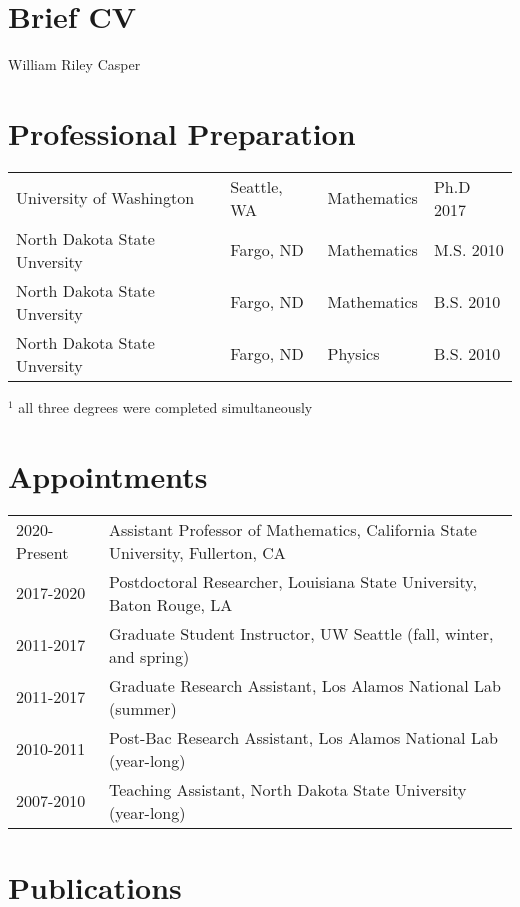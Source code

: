 \documentclass[12pt,letterpaper]{article}
\newcommand{\required}[1]{\section*{\hfil #1\hfil}}                    %
\theoremstyle{definition}
\begin{document}
\required{Brief CV}
\begin{center}
William Riley Casper
\end{center}

\section{Professional Preparation}
\begin{tabular}{llll}
University of Washington\hspace{2in}&Seattle, WA\hspace{2in}&Mathematics\hspace{2in}&Ph.D 2017\\
North Dakota State Unversity&Fargo, ND&Mathematics&M.S. 2010\footnotemark\\
North Dakota State Unversity&Fargo, ND&Mathematics&B.S. 2010\\
North Dakota State Unversity&Fargo, ND&Physics&B.S. 2010\\
\end{tabular}

{$^1$ \footnotesize all three degrees were completed simultaneously}
\section{Appointments}
\begin{tabular}{ll}
2020-Present & Assistant Professor of Mathematics, California State University, Fullerton, CA\\
2017-2020 & Postdoctoral Researcher, Louisiana State University, Baton Rouge, LA\\
2011-2017 & Graduate Student Instructor, UW Seattle (fall, winter, and spring)\\
2011-2017 & Graduate Research Assistant, Los Alamos National Lab (summer)\\
2010-2011 & Post-Bac Research Assistant, Los Alamos National Lab (year-long)\\
2007-2010 & Teaching Assistant, North Dakota State University (year-long)\\
\end{tabular}
\section{Publications}
\end{document}
